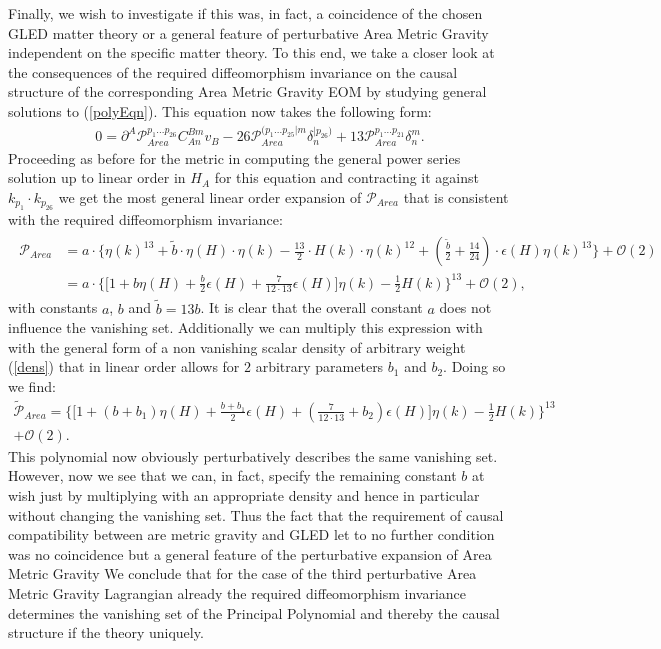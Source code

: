 \documentclass[a4paper,12pt, DIV=14, BCOR=5mm, twoside, headsepline, numbers=noenddot]{scrbook}
\begin{document}
Finally, we wish to investigate if this was, in fact, a coincidence of the chosen GLED matter theory or a general feature of perturbative Area Metric Gravity independent on the specific matter theory. To this end, we take a closer look at the consequences of the required diffeomorphism invariance on the causal structure of the corresponding Area Metric Gravity EOM by studying general solutions to (\ref{polyEqn}). This equation now takes the following form:
\begin{align}\label{AreaPolyEqn}
    0 = \partial^A \mathcal{P}_{Area}^{p_1...p_26} C_{An}^{Bm} v_B - 26\mathcal{P}_{Area}^{(p_1...p_{25}\vert m} \delta_n^{\vert p_{26})} + 13 \mathcal{P}_{Area}^{p_1...p_21} \delta^m_n.
\end{align}
Proceeding as before for the metric in computing the general power series solution up to linear order in $H_A$ for this equation and contracting it against $k_{p_1} \cdot k_{p_{26}}$ we get the most general linear order expansion of $\mathcal{P}_{Area}$ that is consistent with the required diffeomorphism invariance:
\begin{align}
\begin{aligned}
    \mathcal{P}_{Area} &= a \cdot \bigl \{  \eta(k)^{13} + \tilde{b} \cdot \eta(H) \cdot \eta(k) - \frac{13}{2} \cdot  H(k) \cdot \eta(k)^{12} + (\frac{\tilde{b}}{2}+\frac{14}{24}) \cdot \epsilon(H) \eta(k)^{13}  \bigr \} + \mathcal{O}(2)\\
    &=a \cdot \bigl\{  \bigl[ 1 + b \eta(H) + \frac{b}{2} \epsilon(H) +  \frac{7}{12\cdot13} \epsilon(H) \bigr] \eta(k) - \frac{1}{2} H(k)       \bigr\}^{13} + \mathcal{O}(2),
\end{aligned}
\end{align}
with constants $a$, $b$ and $\tilde{b} = 13b$. It is clear that the overall constant $a$ does not influence the vanishing set. Additionally we can multiply this expression with with the general form of a non vanishing scalar density of arbitrary weight (\ref{dens}) that in linear order allows for $2$ arbitrary parameters $b_1$ and $b_2$. Doing so we find:
\begin{multline}
    \tilde{\mathcal{P}}_{Area} = \bigl\{  \bigl[ 1 + (b+ b_1) \eta(H) + \frac{b+b_1}{2} \epsilon(H) +  (\frac{7}{12\cdot13}+b_2) \epsilon(H) \bigr] \eta(k) - \frac{1}{2} H(k)       \bigr\}^{13} \\
    + \mathcal{O}(2).
\end{multline}
This polynomial now obviously perturbatively describes the same vanishing set. However, now we see that we can, in fact, specify the remaining constant $b$ at wish just by multiplying with an appropriate density and hence in particular without changing the vanishing set. 
Thus the fact that the requirement of causal compatibility between are metric gravity and GLED let to no further condition was no coincidence but a general feature of the perturbative expansion of Area Metric Gravity
We conclude that for the case of the third perturbative Area Metric Gravity Lagrangian already the required diffeomorphism invariance determines the vanishing set of the Principal Polynomial and thereby the causal structure if the theory uniquely. 
\end{document}
